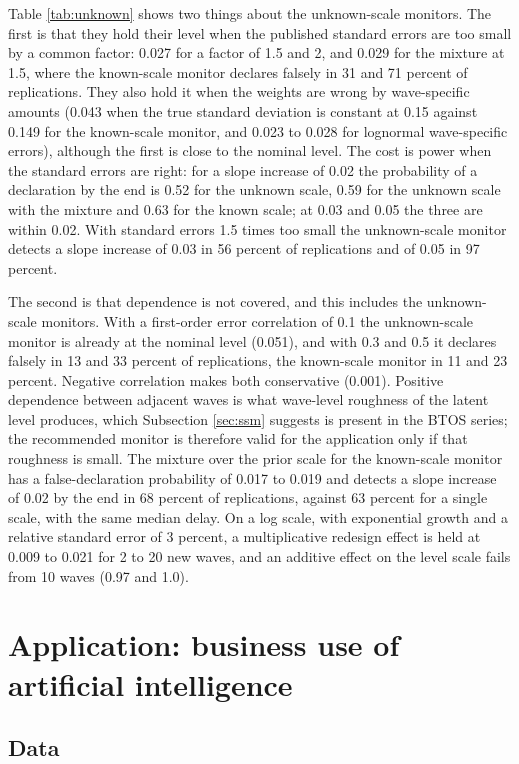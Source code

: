 \documentclass[Afour,sageh,times]{sagej}
\theoremstyle{definition}
\begin{document}
Table \ref{tab:unknown} shows two things about the unknown-scale monitors. The first is that they hold their level when the published standard errors are too small by a common factor: 0.027 for a factor of 1.5 and 2, and 0.029 for the mixture at 1.5, where the known-scale monitor declares falsely in 31 and 71 percent of replications. They also hold it when the weights are wrong by wave-specific amounts (0.043 when the true standard deviation is constant at 0.15 against 0.149 for the known-scale monitor, and 0.023 to 0.028 for lognormal wave-specific errors), although the first is close to the nominal level. The cost is power when the standard errors are right: for a slope increase of 0.02 the probability of a declaration by the end is 0.52 for the unknown scale, 0.59 for the unknown scale with the mixture and 0.63 for the known scale; at 0.03 and 0.05 the three are within 0.02. With standard errors 1.5 times too small the unknown-scale monitor detects a slope increase of 0.03 in 56 percent of replications and of 0.05 in 97 percent.

The second is that dependence is not covered, and this includes the unknown-scale monitors. With a first-order error correlation of 0.1 the unknown-scale monitor is already at the nominal level (0.051), and with 0.3 and 0.5 it declares falsely in 13 and 33 percent of replications, the known-scale monitor in 11 and 23 percent. Negative correlation makes both conservative (0.001). Positive dependence between adjacent waves is what wave-level roughness of the latent level produces, which Subsection \ref{sec:ssm} suggests is present in the BTOS series; the recommended monitor is therefore valid for the application only if that roughness is small. The mixture over the prior scale for the known-scale monitor has a false-declaration probability of 0.017 to 0.019 and detects a slope increase of 0.02 by the end in 68 percent of replications, against 63 percent for a single scale, with the same median delay. On a log scale, with exponential growth and a relative standard error of 3 percent, a multiplicative redesign effect is held at 0.009 to 0.021 for 2 to 20 new waves, and an additive effect on the level scale fails from 10 waves (0.97 and 1.0).

\section{Application: business use of artificial intelligence}
\label{sec:application}

\subsection{Data}
\label{sec:data}
\end{document}
